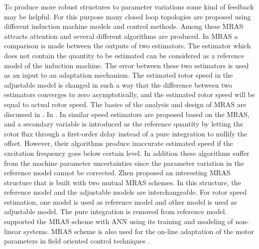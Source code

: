 To produce more robust structures to parameter variations some kind of feedback may be helpful. For this purpose many closed loop topologies are proposed using different induction machine models and control methods. Among these MRAS attracts attention and several different algorithms are produced. In MRAS a comparison is made between the outputs of two estimators. The estimator which does not contain the quantity to be estimated can be considered as a reference model of the induction machine. The error between these two estimators is used as an input to an adaptation mechanism. The estimated rotor speed in the adjustable model is changed in such a way that the difference between two estimators converges to zero asymptotically, and the estimated rotor speed will be equal to actual rotor speed. The basics of the analysis and design of MRAS are discussed in \cite{Vas, booksul}. In \cite{gy, J}. In \cite{cs} similar speed estimators are proposed based on the MRAS, and a secondary variable is introduced as the reference quantity by letting the rotor flux through a first-order delay instead of a pure integration to nullify the offset. However, their algorithms produce inaccurate estimated speed if the excitation frequency goes below certain level. In addition these algorithms suffer from the machine parameter uncertainties since the parameter variation in the reference model cannot be corrected. Zhen \cite{lz} proposed an interesting MRAS structure that is built with two mutual MRAS schemes. In this structure, the reference model and the adjustable models are interchangeable. For rotor speed estimation, one model is used as reference model and other model is used as adjustable model. The pure integration is removed from reference model. \cite{me} supported the MRAS scheme with ANN using its training and modeling of non-linear systems. MRAS scheme is also used for the on-line adaptation of the motor parameters in field oriented control techniques \cite{ca, kubota}.\\

